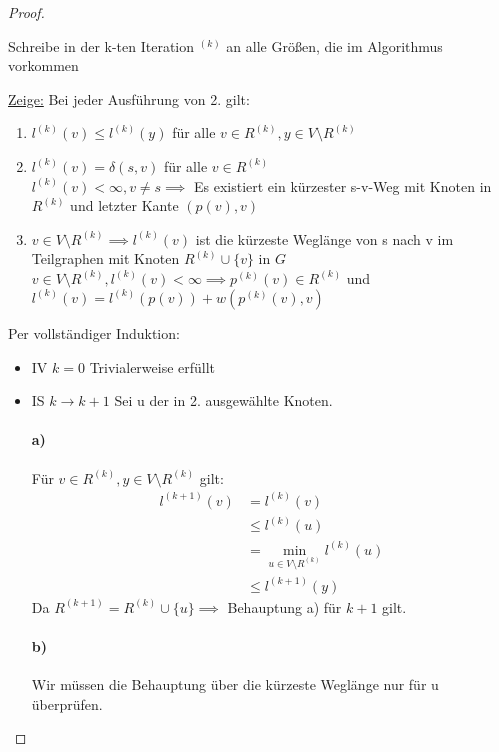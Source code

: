 \begin{proof}
\begin{notation}
Schreibe in der k-ten Iteration $^{(k)}$ an alle Größen, die im Algorithmus vorkommen
\end{notation}
\underline{Zeige:} Bei jeder Ausführung von 2. gilt:
\begin{enumerate}
	\item $l^{(k)}(v) \le l^{(k)}(y)$ für alle $v \in R^{(k)}, y \in V \setminus R^{(k)}$
	\item $l^{(k)}(v)=\delta(s,v)$ für alle $v \in R^{(k)}$ \\
	$l^{(k)}(v)<\infty, v \neq s \implies$ Es existiert ein kürzester s-v-Weg mit Knoten in $R^{(k)}$ und letzter Kante $(p(v),v)$
\item $v \in V \setminus R^{(k)} \implies l^{(k)}(v)$ ist die kürzeste Weglänge 
	von s nach v im Teilgraphen mit Knoten $R^{\left( k \right)} \cup \{v\} $ in $G$ \\
	$v \in V \setminus R^{(k)}, l^{(k)}(v)<\infty \implies p^{(k)}(v) \in R^{(k)}$ und $l^{(k)}(v)=l^{(k)}(p(v))+w(p^{(k)}(v),v)$  
\end{enumerate}
Per vollständiger Induktion:

\begin{itemize}[label=$\lozenge$, itemsep=2ex]
	\item IV \underline{$k=0$} Trivialerweise erfüllt
	\item IS \underline{$k \to k+1$} Sei u der in 2. ausgewählte Knoten.
		\paragraph{a)} Für $v \in R^{(k)}, y \in V \setminus R^{(k)}$ gilt:
		\begin{align*}
			l^{(k+1)}(v)&= l^{(k)}(v) \\
				    &\le  l^{(k)}(u) \\
				    &= \min_{u \in V \setminus R^{(k)}} l^{(k)}(u)\\
				    &\le l^{(k+1)}(y)
		\end{align*}
Da $R^{(k+1)}=R^{(k)}\cup \{u\} \implies $ Behauptung a) für $k+1$ gilt.

\paragraph{b)} Wir müssen die Behauptung über die kürzeste Weglänge nur für u überprüfen.\\


\end{itemize}
\end{proof}
